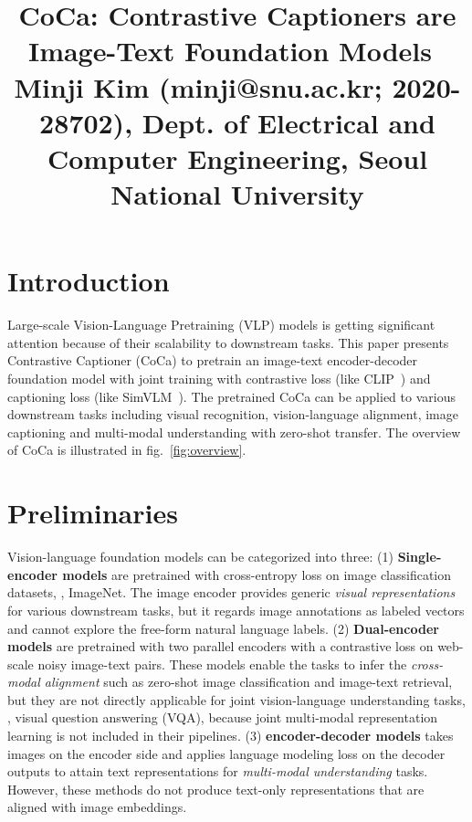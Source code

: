 \documentclass[10pt,twocolumn,letterpaper]{article}
\begin{document}
\title{CoCa: Contrastive Captioners are Image-Text Foundation Models~\cite{coca} \\ {\rm {\normalsize Minji Kim (minji@snu.ac.kr; 2020-28702), Dept. of Electrical and Computer Engineering, Seoul National University}}}   %

\maketitle
\thispagestyle{empty}


\section{Introduction}
Large-scale Vision-Language Pretraining (VLP) models is getting significant attention because of their scalability to downstream tasks.
This paper presents Contrastive Captioner (CoCa) to pretrain an image-text encoder-decoder foundation model with joint training with contrastive loss (like CLIP~\cite{clip}) and captioning loss (like SimVLM~\cite{simvlm}).
The pretrained CoCa can be applied to various downstream tasks including visual recognition, vision-language alignment, image captioning and multi-modal understanding with zero-shot transfer.
The overview of CoCa is illustrated in fig.~\ref{fig:overview}.



\section{Preliminaries}

Vision-language foundation models can be categorized into three:
(1) \textbf{Single-encoder models} are pretrained with cross-entropy loss on image classification datasets, \eg, ImageNet.
The image encoder provides generic \textit{visual representations} for various downstream tasks, but it regards image annotations as labeled vectors and cannot explore the free-form natural language labels.
(2) \textbf{Dual-encoder models} are pretrained with two parallel encoders with a contrastive loss on web-scale noisy image-text pairs.
These models enable the tasks to infer the \textit{cross-modal alignment} such as zero-shot image classification and image-text retrieval, but they are not directly applicable for joint vision-language understanding tasks, \eg, visual question answering (VQA), because joint multi-modal representation learning is not included in their pipelines.
(3) \textbf{encoder-decoder models} takes images on the encoder side and applies language modeling loss on the decoder outputs to attain text representations for \textit{multi-modal understanding} tasks.
However, these methods do not produce text-only representations that are aligned with image embeddings.
\end{document}
